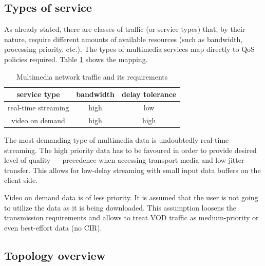 \documentclass[11pt]{book}
\begin{document}
      \subsection{Types of service}
      
        As already stated, there are classes of traffic (or service types) that, by their nature, require different
        amounts of available resources (such as bandwidth, processing priority, etc.). The types of multimedia services
        map directly to QoS policies required. Table \ref{tab:uc:qos} shows the mapping.

        \begin{table}[H]
          \begin{center}
            \begin{tabular}{|c|c|c|}
              \hline
              service type        & bandwidth & delay tolerance \\
              \hline \hline
              real-time streaming & high      & low \\
              \hline
              video on demand     & high      & high  \\
              \hline
            \end{tabular}
          \end{center}


          \caption{Multimedia network traffic and its requirements}
          \label{tab:uc:qos}
        \end{table}

        The most demanding type of multimedia data is undoubtedly real-time streaming. The high priority data has to be
        favoured in order to provide desired level of quality --- precedence when accessing transport media and
        low-jitter transfer. This allows for low-delay streaming with small input data buffers on the client side.

        Video on demand data is of less priority. It is assumed that the user is not going to utilize the data as it is
        being downloaded. This assumption loosens the transmission requirements and allows to treat VOD traffic as
        medium-priority or even best-effort data (no CIR).


      \subsection{Topology overview}
\end{document}
